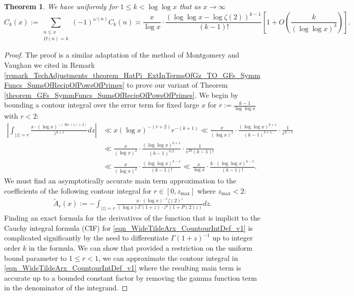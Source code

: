 \documentclass[11pt,reqno,a4letter]{article}
\numberwithin{figure}{section}
\numberwithin{table}{section}
\theoremstyle{plain}
\newtheorem{theorem}{Theorem}
\numberwithin{theorem}{section}
\theoremstyle{definition}
\renewcommand{\Re}{\operatorname{Re}}
\begin{document}
\begin{theorem} 
\label{theorem_CnkSpCasesScaledSummatoryFuncs} 
We have uniformly for $1 \leq k < \log\log x$ 
that as $x \rightarrow \infty$ 
\[
\widehat{C}_k(x) := 
     \sum_{\substack{n \leq x \\ \Omega(n) = k}} (-1)^{\omega(n)} 
     C_k(n) \asymp 
     \frac{x}{\log x} \cdot \frac{(\log\log x -\log\zeta(2))^{k-1}}{(k-1)!} \left[1 + 
     O\left(\frac{k}{(\log\log x)^3}\right)\right]. 
\]
\end{theorem} 
\begin{proof} 
The proof is a similar adaptation of the method of Montgomery and Vaughan we cited in 
Remark \ref{remark_TechAdjustments_theorem_HatPi_ExtInTermsOfGz_TO_GFs_SymmFuncs_SumsOfRecipOfPowsOfPrimes} 
to prove our variant of 
Theorem \ref{theorem_GFs_SymmFuncs_SumsOfRecipOfPowsOfPrimes}. 
We begin by bounding a contour integral over the error term for fixed large $x$ for 
$r := \frac{k-1}{\log\log x}$ with $r < 2$: 
\begin{align*} 
\left\lvert \int_{|z|=r} \frac{x \cdot (\log x)^{-(\Re(z) + 2)}}{z^{k+1}} dz \right\rvert & \ll 
     x (\log x)^{-(r+2)} r^{-(k+1)} \ll \frac{x}{(\log x)^2} \cdot 
     \frac{(\log\log x)^{k+1}}{(k-1)^{k+1}} \cdot \frac{1}{e^{k-1}} \\ 
     & \ll \frac{x}{(\log x)^2} \cdot \frac{(\log\log x)^{k+1}}{(k-1)^{3/2}} \cdot 
     \frac{1}{e^{2k} (k-1)!} \\ 
     & \ll \frac{x}{(\log x)^2} \cdot \frac{(\log\log x)^{k-1}}{(k-1)!} \ll 
     \frac{x}{\log x} \cdot \frac{k \cdot (\log\log x)^{k-5}}{(k-1)!}. 
\end{align*} 
We must find an asymptotically accurate main term approximation to the coefficients 
of the following contour integral for $r \in [0, z_{\max}]$ where $z_{\max} < 2$: 
\begin{align} 
\label{eqn_WideTildeArx_CountourIntDef_v1} 
\widetilde{A}_r(x) := 
     -\int_{|z|=r} \frac{x \cdot (\log x)^{-z} \zeta(2)^{z}}{(\log x) \Gamma(1+z) \cdot 
     z^{k} (1 + P(2) z)} dz. 
\end{align} 
Finding an exact formula for the derivatives of the function that is implicit to the 
Cauchy integral formula (CIF) for \eqref{eqn_WideTildeArx_CountourIntDef_v1} 
is complicated significantly by the need to differentiate $\Gamma(1+z)^{-1}$ 
up to integer order $k$ in the formula. 
We can show that provided a restriction on the uniform bound parameter to 
$1 \leq r < 1$, we can approximate the contour integral in 
\eqref{eqn_WideTildeArx_CountourIntDef_v1} where 
the resulting main term is accurate up to a bounded constant factor by removing the 
gamma function term in the denominator of the integrand. 


\end{proof}
\end{document}
